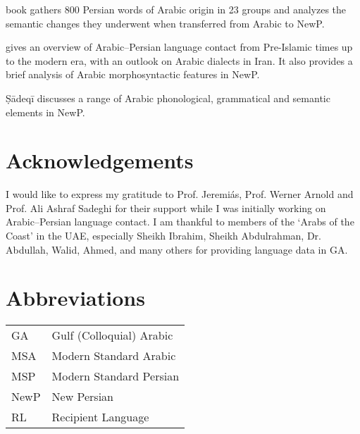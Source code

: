 \documentclass[output=paper]{langsci/langscibook}
\begin{document}
\citet{Asbaghi1987} book gathers 800 Persian words of Arabic origin in 23 groups and analyzes the semantic changes they underwent when transferred from Arabic to NewP.

\citet{Gazsi2011} gives an overview of Arabic–Persian language contact from Pre-Islamic times up to the modern era, with an outlook on Arabic dialects in Iran. It also provides a brief analysis of Arabic morphosyntactic features in NewP.

Ṣādeqī  discusses a range of Arabic phonological, grammatical and semantic elements in NewP.

\section*{Acknowledgements}

I would like to express my gratitude to Prof. Jeremiás, Prof. Werner Arnold and Prof. Ali Ashraf Sadeghi for their support while I was initially working on Arabic–Persian language contact. I am thankful to members of the ‘Arabs of the Coast’ in the UAE, especially Sheikh Ibrahim, Sheikh Abdulrahman, Dr. Abdullah, Walid, Ahmed, and many others for providing language data in GA.

\section*{Abbreviations}
\begin{tabularx}{.70\textwidth}{lQ}
GA & Gulf (Colloquial) Arabic\\
MSA &  Modern Standard Arabic\\
MSP  &  Modern Standard Persian\\
NewP   &  New Persian\\
RL &  Recipient Language \\
\end{tabularx}
\end{document}

